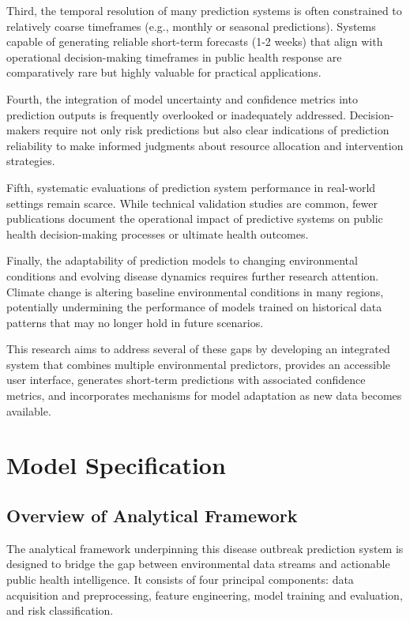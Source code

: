 \documentclass[12pt,a4paper]{report}
\begin{document}
Third, the temporal resolution of many prediction systems is often constrained to relatively coarse timeframes (e.g., monthly or seasonal predictions). Systems capable of generating reliable short-term forecasts (1-2 weeks) that align with operational decision-making timeframes in public health response are comparatively rare but highly valuable for practical applications.

Fourth, the integration of model uncertainty and confidence metrics into prediction outputs is frequently overlooked or inadequately addressed. Decision-makers require not only risk predictions but also clear indications of prediction reliability to make informed judgments about resource allocation and intervention strategies.

Fifth, systematic evaluations of prediction system performance in real-world settings remain scarce. While technical validation studies are common, fewer publications document the operational impact of predictive systems on public health decision-making processes or ultimate health outcomes.

Finally, the adaptability of prediction models to changing environmental conditions and evolving disease dynamics requires further research attention. Climate change is altering baseline environmental conditions in many regions, potentially undermining the performance of models trained on historical data patterns that may no longer hold in future scenarios.

This research aims to address several of these gaps by developing an integrated system that combines multiple environmental predictors, provides an accessible user interface, generates short-term predictions with associated confidence metrics, and incorporates mechanisms for model adaptation as new data becomes available.

\chapter{Model Specification}
\section{Overview of Analytical Framework}
The analytical framework underpinning this disease outbreak prediction system is designed to bridge the gap between environmental data streams and actionable public health intelligence. It consists of four principal components: data acquisition and preprocessing, feature engineering, model training and evaluation, and risk classification.
\end{document}
